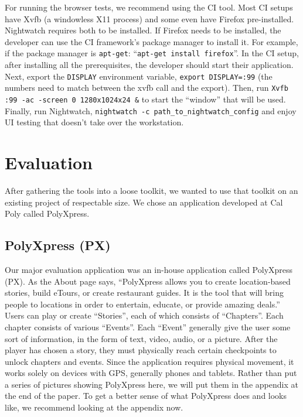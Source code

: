\documentclass[12pt]{ucthesis}
\begin{document}
For running the browser tests, we recommend using the CI tool. Most CI setups have Xvfb (a windowless X11 process) and some even have Firefox pre-installed. Nightwatch requires both to be installed. If Firefox needs to be installed, the developer can use the CI framework's package manager to install it. For example, if the package manager is \lstinline{apt-get}: ``\lstinline{apt-get install firefox}''. In the CI setup, after installing all the prerequisites, the developer should start their application. Next, export the \lstinline{DISPLAY} environment variable, \lstinline{export DISPLAY=:99} (the numbers need to match between the xvfb call and the export). Then, run \lstinline{Xvfb :99 -ac -screen 0 1280x1024x24 &} to start the ``window'' that will be used. Finally, run Nightwatch, \lstinline{nightwatch -c path_to_nightwatch_config} and enjoy UI testing that doesn't take over the workstation.


\chapter{Evaluation}
After gathering the tools into a loose toolkit, we wanted to use that toolkit on an existing project of respectable size. We chose an application developed at Cal Poly called PolyXpress.

\section{PolyXpress (PX)}
Our major evaluation application was an in-house application called PolyXpress (PX)\cite{PX}. As the About page says, ``PolyXpress allows you to create location-based stories, build eTours, or create restaurant guides. It is the tool that will bring people to locations in order to entertain, educate, or provide amazing deals.''\cite{PX} Users can play or create ``Stories'', each of which consists of ``Chapters''. Each chapter consists of various ``Events''. Each ``Event'' generally give the user some sort of information, in the form of text, video, audio, or a picture. After the player has chosen a story, they must physically reach certain checkpoints to unlock chapters and events. Since the application requires physical movement, it works solely on devices with GPS, generally phones and tablets. Rather than put a series of pictures showing PolyXpress here, we will put them in the appendix at the end of the paper. To get a better sense of what PolyXpress does and looks like, we recommend looking at the appendix now.
\end{document}
